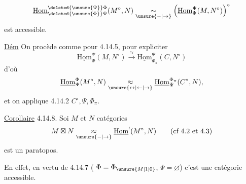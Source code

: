 \[
\underline{\mathrm{Hom}}_{\deleted{\unsure{\Phi}}\Psi}^{\deleted{\unsure{\Psi}}\Phi}(M^\circ,N)
\underset{\unsure{-|\to}}{\sim}
\left(\underline{\mathrm{Hom}}_{\Phi}^{\Psi}(M,N^\circ)\right)^\circ
\]
est accessible.

\uline{Dém} On procède comme pour 4.14.5, pour expliciter
\[
\underline{\mathrm{Hom}}_{\Phi}^{\Psi}(M,N^\circ)\xrightarrow{\approx}
\underline{\mathrm{Hom}}_{\Phi_\pi}^{\Psi}(C,N^\circ)
\]
d'où
\[
\underline{\mathrm{Hom}}_{\Psi}^{\Phi}(M^\circ,N)
\underset{\unsure{\leftrightarrow|\leftarrow|\to}}{\approx}
\underline{\mathrm{Hom}}_{\Psi}^{\Phi_\pi}(C^\circ,N),
\]
et on applique 4.14.2  $C^\circ,\Psi,\Phi_\pi$.

\uline{Corollaire} 4.14.8. Soi $M$ et $N$  catégories  
\[
M\boxtimes N\underset{\unsure{-|\to}}{\approx}\underline{\mathrm{Hom}}^!(M^\circ,N)
\qquad\text{(cf 4.2 et 4.3)}
\]
est un paratopos.

En effet, en vertu de 4.14.7 ( $\Phi=\Phi_{\unsure{M|1|0}}$, $\Psi=\varnothing$) c'est une catégorie accessible.
